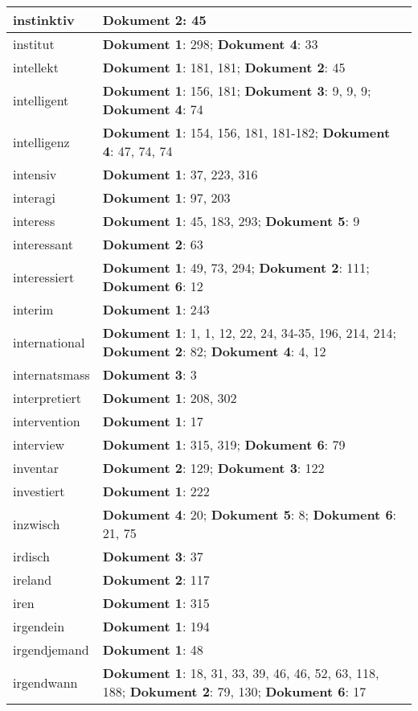 \documentclass[a5paper]{article}
\begin{document}
\begin{longtable}[l]{|l|p{3in}|}
\hline
instinktiv & \textbf{Dokument 2}: 45 \\
\hline
institut & \textbf{Dokument 1}: 298; \textbf{Dokument 4}: 33 \\
\hline
intellekt & \textbf{Dokument 1}: 181, 181; \textbf{Dokument 2}: 45 \\
\hline
intelligent & \textbf{Dokument 1}: 156, 181; \textbf{Dokument 3}: 9, 9, 9; \textbf{Dokument 4}: 74 \\
\hline
intelligenz & \textbf{Dokument 1}: 154, 156, 181, 181-182; \textbf{Dokument 4}: 47, 74, 74 \\
\hline
intensiv & \textbf{Dokument 1}: 37, 223, 316 \\
\hline
interagi & \textbf{Dokument 1}: 97, 203 \\
\hline
interess & \textbf{Dokument 1}: 45, 183, 293; \textbf{Dokument 5}: 9 \\
\hline
interessant & \textbf{Dokument 2}: 63 \\
\hline
interessiert & \textbf{Dokument 1}: 49, 73, 294; \textbf{Dokument 2}: 111; \textbf{Dokument 6}: 12 \\
\hline
interim & \textbf{Dokument 1}: 243 \\
\hline
international & \textbf{Dokument 1}: 1, 1, 12, 22, 24, 34-35, 196, 214, 214; \textbf{Dokument 2}: 82; \textbf{Dokument 4}: 4, 12 \\
\hline
internatsmass & \textbf{Dokument 3}: 3 \\
\hline
interpretiert & \textbf{Dokument 1}: 208, 302 \\
\hline
intervention & \textbf{Dokument 1}: 17 \\
\hline
interview & \textbf{Dokument 1}: 315, 319; \textbf{Dokument 6}: 79 \\
\hline
inventar & \textbf{Dokument 2}: 129; \textbf{Dokument 3}: 122 \\
\hline
investiert & \textbf{Dokument 1}: 222 \\
\hline
inzwisch & \textbf{Dokument 4}: 20; \textbf{Dokument 5}: 8; \textbf{Dokument 6}: 21, 75 \\
\hline
irdisch & \textbf{Dokument 3}: 37 \\
\hline
ireland & \textbf{Dokument 2}: 117 \\
\hline
iren & \textbf{Dokument 1}: 315 \\
\hline
irgendein & \textbf{Dokument 1}: 194 \\
\hline
irgendjemand & \textbf{Dokument 1}: 48 \\
\hline
irgendwann & \textbf{Dokument 1}: 18, 31, 33, 39, 46, 46, 52, 63, 118, 188; \textbf{Dokument 2}: 79, 130; \textbf{Dokument 6}: 17 \\

\end{longtable}
\end{document}
